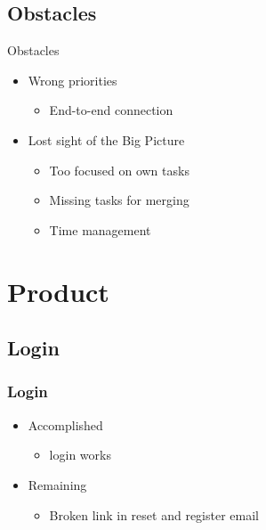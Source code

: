 \documentclass[aspectratio=1610,20pt,utf8]{beamer}
\begin{document}
\subsection{Obstacles}
\begin{frame}{Obstacles}
	\begin{itemize}
	\item Wrong priorities
	\begin{itemize}
		\item End-to-end connection
	\end{itemize}
	\item Lost sight of the Big Picture
	\begin{itemize}
		\item Too focused on own tasks
		\item Missing tasks for merging
		\item Time management
	\end{itemize}
	\end{itemize}

\end{frame}
\section{Product}
\subsection{Login}
\begin{frame}
	\frametitle{Login}
	\begin{itemize}
		\item Accomplished
		\begin{itemize}
			\item login works
		\end{itemize}
		\item Remaining
		\begin{itemize}
			\item Broken link in reset and register email
		\end{itemize}
	\end{itemize}

\end{frame}

\end{document}

